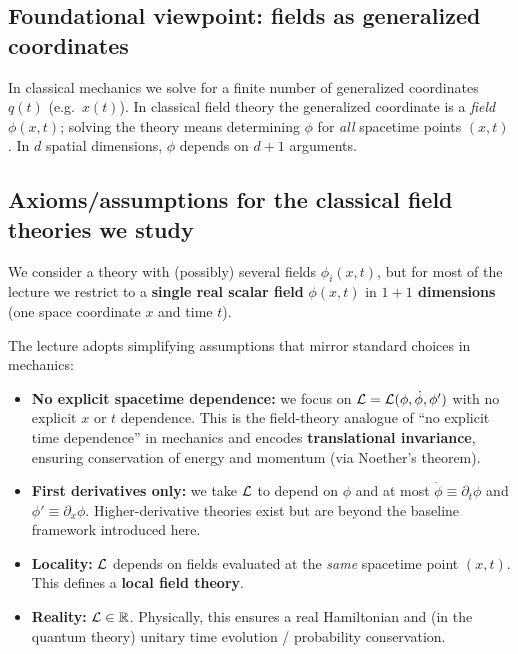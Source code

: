 \subsection*{Foundational viewpoint: fields as generalized coordinates}

\begin{remark}
In classical mechanics we solve for a finite number of generalized
coordinates \(q(t)\) (e.g.\ \(x(t)\)). In classical field theory the
generalized coordinate is a \emph{field} \(\phi(x,t)\); solving the theory
means determining \(\phi\) for \emph{all} spacetime points \((x,t)\). In
\(d\) spatial dimensions, \(\phi\) depends on \(d+1\) arguments.
\end{remark}

\subsection*{Axioms/assumptions for the classical field theories we study}

We consider a theory with (possibly) several fields \(\phi_i(x,t)\), but
for most of the lecture we restrict to a \textbf{single real scalar
field} \(\phi(x,t)\) in \textbf{\(1+1\) dimensions} (one space coordinate
\(x\) and time \(t\)).


The lecture adopts simplifying assumptions that mirror standard choices
in mechanics:
\begin{itemize}
  \item \textbf{No explicit spacetime dependence:} we focus on
    \(\mathcal{L}=\mathcal{L}(\phi,\dot\phi,\phi')\) with no explicit \(x\) or \(t\)
    dependence. This is the field-theory analogue of ``no explicit time
    dependence'' in mechanics and encodes \textbf{translational
    invariance}, ensuring conservation of energy and momentum (via
    Noether's theorem).
  \item \textbf{First derivatives only:} we take \(\mathcal{L}\) to depend on
    \(\phi\) and at most \(\dot\phi\equiv\partial_t\phi\) and
    \(\phi'\equiv\partial_x\phi\). Higher-derivative theories exist but
    are beyond the baseline framework introduced here.
  \item \textbf{Locality:} \(\mathcal{L}\) depends on fields evaluated at the
    \emph{same} spacetime point \((x,t)\). This defines a \textbf{local
    field theory}.
  \item \textbf{Reality:} \(\mathcal{L}\in\mathbb{R}\). Physically, this
    ensures a real Hamiltonian and (in the quantum theory) unitary time
    evolution / probability conservation.
\end{itemize}


